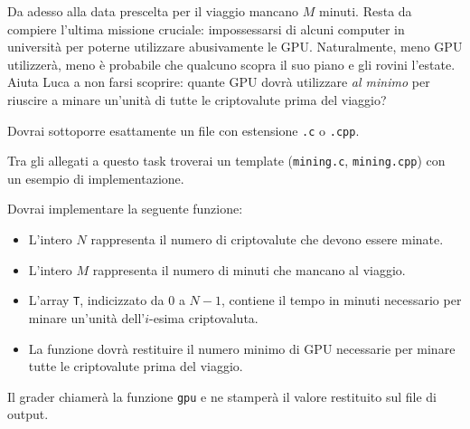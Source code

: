      Da adesso alla data prescelta per il viaggio mancano $M$ minuti. Resta da compiere l'ultima missione cruciale: impossessarsi di alcuni computer in università per poterne utilizzare abusivamente le GPU. Naturalmente, meno GPU utilizzerà, meno è probabile che qualcuno scopra il suo piano e gli rovini l'estate. Aiuta Luca a non farsi scoprire: quante GPU dovrà utilizzare \emph{al minimo} per riuscire a minare un'unità di tutte le criptovalute prima del viaggio?


\Implementation


Dovrai sottoporre esattamente un file con estensione \texttt{.c} o \texttt{.cpp}.

\begin{warning}
Tra gli allegati a questo task troverai un template (\texttt{mining.c}, \texttt{mining.cpp}) con un esempio di implementazione.
\end{warning}

Dovrai implementare la seguente funzione:

\begin{itemize}[nolistsep]
	
	\begin{itemize}[nolistsep]
	  \item L'intero $N$ rappresenta il numero di criptovalute che devono essere minate.
	  \item L'intero $M$ rappresenta il numero di minuti che mancano al viaggio.
      \item L'array \texttt{T}, indicizzato da $0$ a $N-1$, contiene il tempo in minuti necessario per minare un'unità dell'$i$-esima criptovaluta.
      \item La funzione dovrà restituire il numero minimo di GPU necessarie per minare tutte le criptovalute prima del viaggio.
    \end{itemize}
\end{itemize}

\medskip

Il grader chiamerà la funzione \texttt{gpu} e ne stamperà il valore restituito sul file di output.



